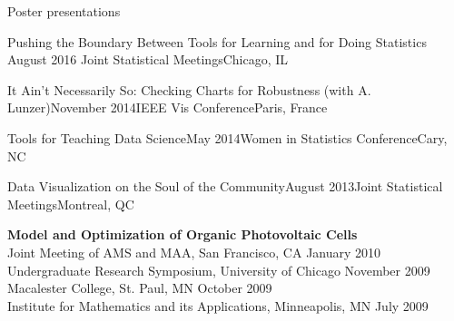 \documentclass{resume} %
\begin{document}
\begin{rSection}{Poster presentations}

\begin{sSubsection}{Pushing the Boundary Between Tools for Learning and for Doing Statistics}{ }{August 2016 }{Joint Statistical Meetings}{Chicago, IL}
\end{sSubsection}

\begin{sSubsection}{It Ain't Necessarily So: Checking Charts for Robustness}{ (with A. Lunzer)}{November 2014}{IEEE Vis Conference}{Paris, France}
\end{sSubsection}

\begin{sSubsection}{Tools for Teaching Data Science}{}{May 2014}{Women in Statistics Conference}{Cary, NC}
\end{sSubsection}

\begin{sSubsection}{Data Visualization on the Soul of the Community}{}{August 2013}{Joint Statistical Meetings}{Montreal, QC}
\end{sSubsection}


{\bf Model and Optimization of Organic Photovoltaic Cells} \hfill \\ 
Joint Meeting of AMS and MAA, San Francisco, CA \hfill January 2010 \\
Undergraduate Research Symposium, University of Chicago \hfill November 2009 \\
Macalester College, St. Paul, MN \hfill  October 2009 \\ 
Institute for Mathematics and its Applications, Minneapolis, MN \hfill July 2009 \\
\end{rSection}

\end{document}
